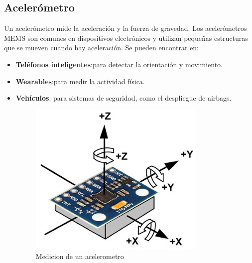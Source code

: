 \subsection{Acelerómetro}
Un acelerómetro mide la aceleración y la fuerza de gravedad. Los acelerómetros MEMS son comunes en dispositivos electrónicos y utilizan pequeñas estructuras que se mueven cuando hay aceleración. Se pueden encontrar en:
\begin{itemize}
	\item \textbf{Teléfonos inteligentes}:para detectar la orientación y movimiento.
	\item \textbf{Wearables}:para medir la actividad física.
	\item \textbf{Vehículos}: para sistemas de seguridad, como el despliegue de airbags.
	\begin{figure}[h]
	\centering
	\includegraphics[width=6 cm]{img/ace1}
	\caption{Medicion de un acelerometro}
	\label{fig:ace1}
\end{figure}
\end{itemize}
